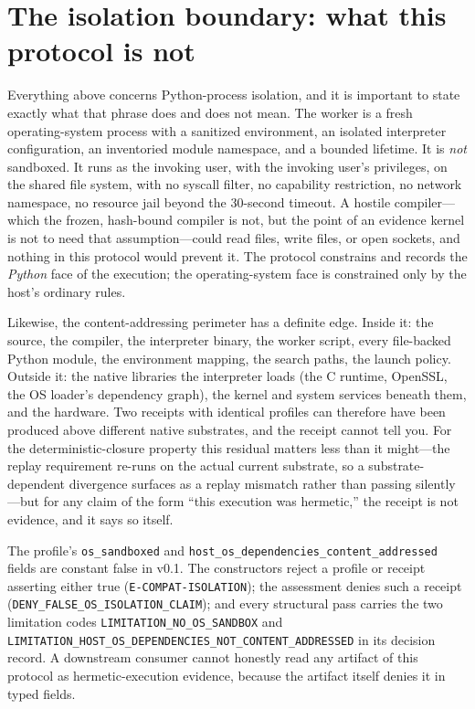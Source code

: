 \section{The isolation boundary: what this protocol is not}\label{ch07:not-sandbox}

Everything above concerns Python-process isolation, and it is important to state exactly what that phrase does and does not mean. The worker is a fresh operating-system process with a sanitized environment, an isolated interpreter configuration, an inventoried module namespace, and a bounded lifetime. It is \emph{not} sandboxed. It runs as the invoking user, with the invoking user's privileges, on the shared file system, with no syscall filter, no capability restriction, no network namespace, no resource jail beyond the 30-second timeout. A hostile compiler---which the frozen, hash-bound compiler is not, but the point of an evidence kernel is not to need that assumption---could read files, write files, or open sockets, and nothing in this protocol would prevent it. The protocol constrains and records the \emph{Python} face of the execution; the operating-system face is constrained only by the host's ordinary rules.

Likewise, the content-addressing perimeter has a definite edge. Inside it: the source, the compiler, the interpreter binary, the worker script, every file-backed Python module, the environment mapping, the search paths, the launch policy. Outside it: the native libraries the interpreter loads (the C runtime, OpenSSL, the OS loader's dependency graph), the kernel and system services beneath them, and the hardware. Two receipts with identical profiles can therefore have been produced above different native substrates, and the receipt cannot tell you. For the deterministic-closure property this residual matters less than it might---the replay requirement re-runs on the actual current substrate, so a substrate-dependent divergence surfaces as a replay mismatch rather than passing silently---but for any claim of the form ``this execution was hermetic,'' the receipt is not evidence, and it says so itself.

\begin{boundary}\label{ch07:bd:nonsandbox}
The profile's \texttt{os\_sandboxed} and \texttt{host\_os\_dependencies\_content\_addressed} fields are constant false in v0.1. The constructors reject a profile or receipt asserting either true (\texttt{E-COMPAT-ISOLATION}); the assessment denies such a receipt (\texttt{DENY\_FALSE\_OS\_ISOLATION\_CLAIM}); and every structural pass carries the two limitation codes \texttt{LIMITATION\_NO\_OS\_SANDBOX} and \texttt{LIMITATION\_HOST\_OS\_DEPENDENCIES\_NOT\_CONTENT\_ADDRESSED} in its decision record. A downstream consumer cannot honestly read any artifact of this protocol as hermetic-execution evidence, because the artifact itself denies it in typed fields.
\end{boundary}

